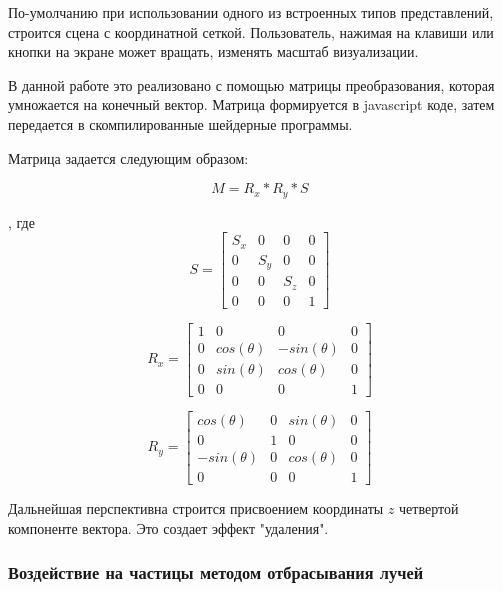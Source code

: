 По-умолчанию при использовании одного из встроенных типов представлений,
строится сцена с координатной сеткой. Пользователь, нажимая на клавиши
или кнопки на экране может вращать, изменять масштаб визуализации.

В данной работе это реализовано с помощью матрицы преобразования,
которая умножается на конечный вектор. Матрица формируется в javascript 
коде, затем передается в скомпилированные шейдерные программы.

Матрица задается следующим образом:

\begin{equation}
\label{eq:}
  M = R_x * R_y * S
\end{equation}

, где \\

\begin{equation}
\label{eq:}
  S = 
  \begin{bmatrix}
    S_x & 0 & 0 & 0 \\
    0  & S_y & 0 & 0 \\
    0  & 0 & S_z & 0 \\
    0 & 0 & 0 & 1
  \end{bmatrix}
\end{equation}

\begin{equation}
\label{eq:}
R_x = 
\begin{bmatrix}
  1 & 0 & 0 & 0 \\
  0 & cos(\theta) & -sin(\theta) & 0 \\
  0 & sin(\theta) & cos(\theta) & 0 \\
  0 & 0 & 0 & 1
\end{bmatrix}
\end{equation}

\begin{equation}
\label{eq:}
R_y = 
\begin{bmatrix}
  cos(\theta) & 0 & sin(\theta) & 0 \\
  0 & 1 & 0 & 0 \\
  -sin(\theta) & 0 & cos(\theta) & 0 \\
  0 & 0 & 0 & 1
\end{bmatrix}
\end{equation}

Дальнейшая перспективна строится присвоением координаты $z$ четвертой компоненте
вектора. Это создает эффект "удаления".

\subsubsection{Воздействие на частицы методом отбрасывания лучей}

